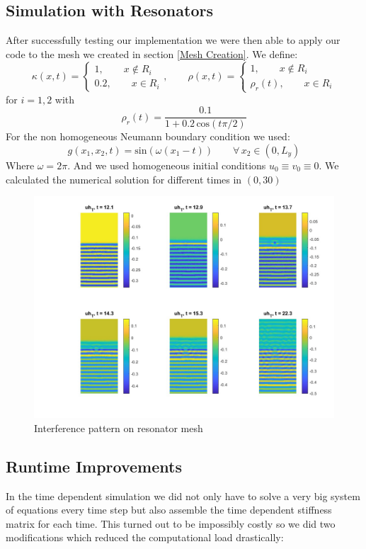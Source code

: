 \documentclass{article}
\begin{document}
\subsection{Simulation with Resonators}
After successfully testing our implementation we were then able to apply our code to the mesh we created in section \ref{Mesh Creation}. We define:
\begin{equation*}
\kappa(x,t) = 
\left\{
\begin{aligned}
1, \qquad x\notin R_i \\
0.2, \qquad x \in R_i
\end{aligned}
\right. ,\qquad
\rho(x,t) = 
\left\{
\begin{aligned}
1, \qquad x\notin R_i \\
\rho_r(t), \qquad x \in R_i
\end{aligned}
\right.
\end{equation*}
for $i = 1,2$ with 
\[
	\rho_r(t) = \frac{0.1}{1 + 0.2\, \text{cos}(t\pi/2)}
\]
For the non homogeneous Neumann boundary condition we used: 
\[
	g(x_1,x_2,t) = \text{sin}(\omega(x_1-t)) \qquad \forall\, x_2 
	\in (0,L_y)
\]
Where $\omega = 2\pi$. And we used homogeneous initial conditions
$u_0 \equiv v_0 \equiv 0$. We calculated the numerical solution for different times in $(0,30)$

\begin{figure}\label{fig:interference}
\center
\includegraphics[width=\linewidth]{interference.jpg}
\caption{Interference pattern on resonator mesh}
\end{figure}

\subsection{Runtime Improvements}
In the time dependent simulation we did not only have to solve a very big system of equations every time step but also assemble the time dependent stiffness matrix for each time. This turned out to be impossibly costly so we did two modifications which reduced the computational load drastically: \\
\end{document}
